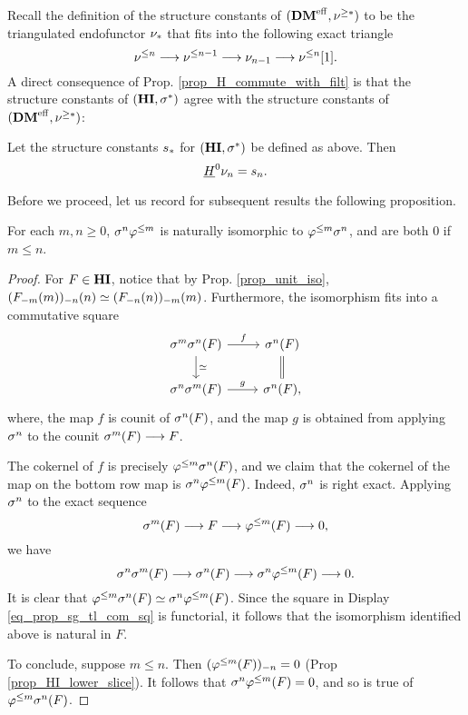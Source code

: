 Recall the definition of the structure constants of $(\DMeff, 
\sgDM{*})$ to be the triangulated endofunctor $\sliceDM{*}$ that
fits into the following exact triangle
\[
\slDM{n} \to \slDM{n - 1} \to \sliceDM{n - 1} \to \slDM{n}[1].
\]
A direct consequence of Prop. \ref{prop_H_commute_with_filt} is 
that the structure constants of $(\HI, \sgHI{*})$ agree with the 
structure constants of $(\DMeff, \sgDM{*})$:

\begin{cor}\label{cor_H_commute_with_slice}
Let the structure constants $\slice{*}$ for $(\HI, \sgHI{*})$ be 
defined as above. Then
\[
\sheaf{H}^0 \sliceDM{n} = \slice{n}.
\]
\end{cor}

Before we proceed, let us record for subsequent results the 
following proposition.

\begin{prop}\label{prop_sg_tl_commute}
For each $m, n \geq 0$, $\sgHI{n} \tlHI{m}$ is naturally
isomorphic to $\tlHI{m} \sgHI{n}$, and are both 0 if $m \leq n$.
\end{prop}
\begin{proof}
For $F \in \HI$, notice that by Prop. \ref{prop_unit_iso}, 
$\LHI[n]{\RHI[n]{(\LHI[m]{\RHI[m]{F}})}} \simeq
\LHI[m]{\RHI[m]{(\LHI[n]{\RHI[n]{F}})}}$. Furthermore, the 
isomorphism fits into a commutative square
\begin{equation}\label{eq_prop_sg_tl_com_sq}
\begin{tikzcd}
\sgHI{m}\sgHI{n}(F) \arrow{r}{f} \arrow{d}{\simeq} & 
\sgHI{n}(F) \arrow[equal]{d} \\
\sgHI{n}\sgHI{m}(F) \arrow{r}{g} &
\sgHI{n}(F),
\end{tikzcd}
\end{equation}
where, the map $f$ is counit of $\sgHI{n}(F)$, and the map $g$
is obtained from applying $\sgHI{n}$ to the counit $\sgHI{m}(F) 
\to F$.

The cokernel of $f$ is precisely $\tlHI{m} \sgHI{n}(F)$, and we 
claim that the cokernel of the map on the bottom row map is 
$\sgHI{n} \tlHI{m}(F)$. Indeed, $\sgHI{n}$ is right exact. Applying 
$\sgHI{n}$ to the exact sequence
\[
\sgHI{m}(F) \to F \to \tlHI{m}(F) \to 0,
\]
we have
\[
\sgHI{n} \sgHI{m}(F) \to \sgHI{n}(F) \to \sgHI{n} \tlHI{m}(F) \to 0.
\]
It is clear that $\tlHI{m} \sgHI{n}(F) \simeq \sgHI{n} \tlHI{m}(F)$.
Since the square in Display \ref{eq_prop_sg_tl_com_sq} is 
functorial, it follows that the isomorphism identified above is
natural in $F$.

To conclude, suppose $m \leq n$. Then $\RHI[n]{(\tlHI{m}(F))} = 0$
(Prop \ref{prop_HI_lower_slice}). It follows that $\sgHI{n} 
\tlHI{m}(F) = 0$, and so is true of $\tlHI{m} \sgHI{n}(F)$.
\end{proof}

